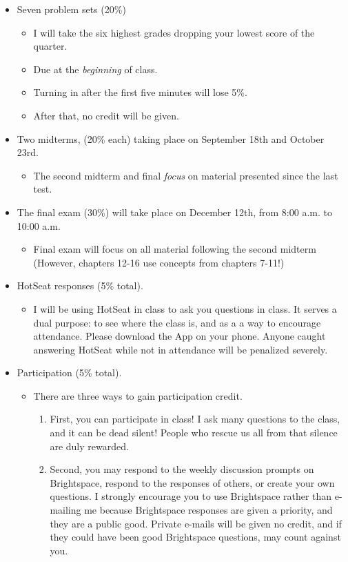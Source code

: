 \documentclass[a4paper]{article}
\begin{document}
\begin{itemize}
\item Seven problem sets (20\%)
\begin{itemize}
\item I will take the six highest grades dropping your lowest score of the quarter.
\item Due at the \emph{beginning} of class.
\item Turning in after the first five minutes will lose 5\%.
\item After that, no credit will be given.
\end{itemize}
\item Two midterms, (20\% each) taking place on September 18th and October 23rd.  
\begin{itemize}
\item The second midterm and final \emph{focus} on material presented since the last test.
\end{itemize}
\item The final exam (30\%) will take place on December 12th, from 8:00 a.m. to 10:00 a.m.
\begin{itemize}
\item Final exam will focus on all material following the second midterm (However, chapters 12-16 use concepts from chapters 7-11!) 
\end{itemize}
\item HotSeat responses (5\% total).
\begin{itemize}
\item I will be using HotSeat in class to ask you questions in class.  It serves a dual purpose:  to see where the class is, and as a a way to encourage attendance.  Please download the App on your phone.  Anyone caught answering HotSeat while not in attendance will be penalized severely.
\end{itemize}
\item Participation (5\% total).
\begin{itemize}
\item There are three ways to gain participation credit.
\begin{enumerate}
\item First, you can participate in class!  I ask many questions to the class, and it can be dead silent!  People who rescue us all from that silence are duly rewarded.
\item Second, you may respond to the weekly discussion prompts on Brightspace, respond to the responses of others, or create your own questions.  I strongly encourage you to use Brightspace rather than e-mailing me because Brightspace responses are given a priority, and they are a public good.  Private e-mails will be given no credit, and if they could have been good Brightspace questions, may count against you.

\end{enumerate}
\end{itemize}
\end{itemize}
\end{document}
